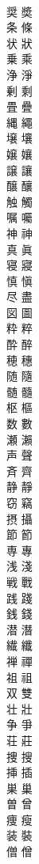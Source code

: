 \documentclass[8pt]{extreport}
\begin{document}
\begin{CJK}{UTF8}{min}
\\	奨	奬
\\	条	條
\\	状	狀
\\	乗	乘
\\	浄	淨
\\	剰	剩
\\	畳	疊
\\	縄	繩
\\	壌	壤
\\	嬢	孃
\\	譲	讓
\\	醸	釀
\\	触	觸
\\	嘱	囑
\\	神	神
\\	真	眞
\\	寝	寢
\\	慎	愼
\\	尽	盡
\\	図	圖
\\	粋	粹
\\	酔	醉
\\	穂	穗
\\	随	隨
\\	髄	髓
\\	枢	樞
\\	数	數
\\	瀬	瀨
\\	声	聲
\\	斉	齊
\\	静	靜
\\	窃	竊
\\	摂	攝
\\	節	節
\\	専	專
\\	浅	淺
\\	戦	戰
\\	践	踐
\\	銭	錢
\\	潜	潛
\\	繊	纖
\\	禅	禪
\\	祖	祖
\\	双	雙
\\	壮	壯
\\	争	爭
\\	荘	莊
\\	捜	搜
\\	挿	插
\\	巣	巢
\\	曽	曾
\\	痩	瘦
\\	装	裝
\\	僧	僧

\end{CJK}
\end{document}
